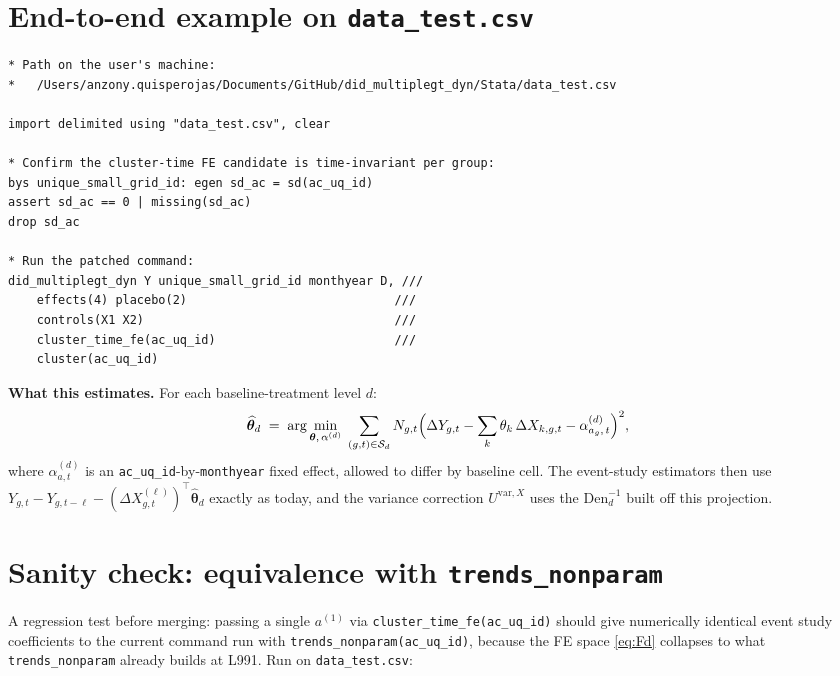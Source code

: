 \documentclass[11pt]{article}
\newcommand{\code}[1]{\texttt{\small #1}}
\newcommand{\1}{\mathbb{1}}
\newcommand{\Smpl}{\mathcal{S}}
\newcommand{\thetad}{\widehat{\bm{\theta}}_d}
\newcommand{\Ngt}{N_{g,t}}
\begin{document}
\section{End-to-end example on \texttt{data\_test.csv}}

\begin{lstlisting}
* Path on the user's machine:
*   /Users/anzony.quisperojas/Documents/GitHub/did_multiplegt_dyn/Stata/data_test.csv

import delimited using "data_test.csv", clear

* Confirm the cluster-time FE candidate is time-invariant per group:
bys unique_small_grid_id: egen sd_ac = sd(ac_uq_id)
assert sd_ac == 0 | missing(sd_ac)
drop sd_ac

* Run the patched command:
did_multiplegt_dyn Y unique_small_grid_id monthyear D, ///
    effects(4) placebo(2)                             ///
    controls(X1 X2)                                   ///
    cluster_time_fe(ac_uq_id)                         ///
    cluster(ac_uq_id)
\end{lstlisting}

\noindent\textbf{What this estimates.} For each baseline-treatment level $d$:
\begin{equation}
\thetad \;=\; \arg\min_{\bm{\theta},\,\alpha^{(d)}}\;
\sum_{(g,t)\in\Smpl_d}\Ngt\Bigl(\Delta Y_{g,t} - \sum_{k}\theta_k\,\Delta X_{k,g,t} - \alpha^{(d)}_{a_g,\,t}\Bigr)^{2},
\label{eq:fwl}
\end{equation}
where $\alpha^{(d)}_{a,t}$ is an \code{ac\_uq\_id}-by-\code{monthyear} fixed
effect, allowed to differ by baseline cell. The event-study estimators
then use $Y_{g,t} - Y_{g,t-\ell} - (\Delta X^{(\ell)}_{g,t})^{\!\top}\thetad$
exactly as today, and the variance correction $U^{\mathrm{var},X}$ uses the
$\mathrm{Den}_d^{-1}$ built off this projection.

\section{Sanity check: equivalence with \texttt{trends\_nonparam}}

A regression test before merging: passing a single $a^{(1)}$ via
\code{cluster\_time\_fe(ac\_uq\_id)} should give numerically identical event
study coefficients to the current command run with
\code{trends\_nonparam(ac\_uq\_id)}, because the FE space \eqref{eq:Fd}
collapses to what \texttt{trends\_nonparam} already builds at L991. Run on
\code{data\_test.csv}:
\end{document}
